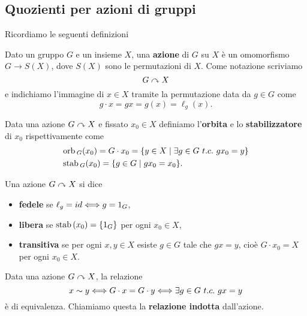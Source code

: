 \begin{multicols*}{2}
\section{Quozienti per azioni di gruppi}
Ricordiamo le seguenti definizioni
\begin{definition}[Azione]
Dato un gruppo $G$ e un insieme $X$, una \textbf{azione} di $G$ su $X$ \`e un omomorfismo $G\to S(X)$, dove $S(X)$ sono le permutazioni di $X$. Come notazione scriviamo \[G\curvearrowright X\] e indichiamo l'immagine di $x\in X$ tramite la permutazione data da $g\in G$ come \[g\cdot x=gx=g(x)=\ell_g(x).\]
\end{definition}
\begin{definition}
Data una azione $G\curvearrowright X$ e fissato $x_0\in X$ definiamo l'\textbf{orbita} e lo \textbf{stabilizzatore} di $x_0$ rispettivamente come
\begin{align*}
&\orb_G(x_0)=G\cdot x_0=\{y\in X\mid \exists g\in G\ t.c.\ gx_0=y\}\\
&\stab_G(x_0)=\{g\in G\mid gx_0=x_0\}.
\end{align*}
\end{definition}
\begin{definition}
Una azione $G\curvearrowright X$ si dice
\begin{itemize}[noitemsep]
\item \textbf{fedele} se $\ell_g=id\Longleftrightarrow g=1_G$,
\item \textbf{libera} se $\mathrm{stab}\,(x_0)=\{1_G\}$ per ogni $x_0\in X$,
\item \textbf{transitiva} se per ogni $x,y\in X$ esiste $g\in G$ tale che $gx=y$, cio\`e $G\cdot x_0=X$ per ogni $x_0\in X$.
\end{itemize}
\end{definition}
\begin{remark}
Data una azione $G\curvearrowright X$, la relazione
\[x\sim y\Longleftrightarrow G\cdot x=G\cdot y\Longleftrightarrow \exists g\in G\ t.c.\ gx=y\]
\`e di equivalenza. Chiamiamo questa la \textbf{relazione indotta} dall'azione.
\end{remark}
\vspace{0.5cm}


\end{multicols*}
